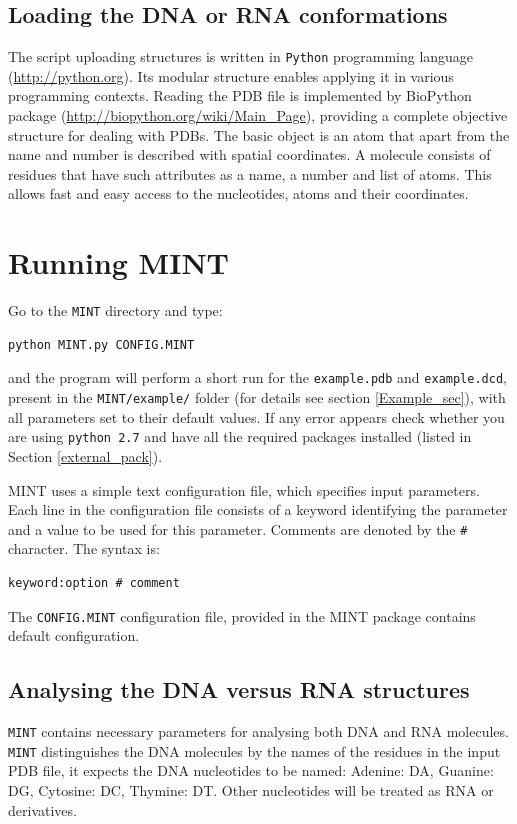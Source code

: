 \documentclass[12pt]{article}
\begin{document}
\subsection{Loading the DNA or RNA conformations}
The script uploading structures is written in {\tt Python} programming language (\url{http://python.org}). Its modular structure enables applying it in various programming contexts. Reading the PDB file is implemented by BioPython package (\url{http://biopython.org/wiki/Main_Page}), providing a complete objective structure for dealing with PDBs. The basic object is an atom that apart from the name and number is described with spatial coordinates. A molecule consists of residues that have such attributes as a name, a number and list of atoms. This allows fast and easy access to the nucleotides, atoms and their coordinates.

\section{Running MINT}
Go to the \texttt{MINT} directory and type:
\begin{verbatim}
python MINT.py CONFIG.MINT
\end{verbatim}
and the program will perform a short run for the \texttt{example.pdb} and \texttt{example.dcd}, present in the \texttt{MINT/example/} folder (for details see section \ref{Example_sec}), with all parameters set to their default values. If any error appears check whether you are using {\tt python 2.7} and have all the required packages installed (listed in Section \ref{external_pack}).

MINT uses a simple text configuration file, which specifies input parameters. Each line in the configuration file consists of a keyword identifying the parameter and a value to be used for this parameter. Comments are denoted by the \texttt{\#} character. The syntax is:
\begin{verbatim}
keyword:option # comment
\end{verbatim}

The \texttt{CONFIG.MINT} configuration file, provided in the MINT package contains default configuration. 

\subsection{Analysing the DNA versus RNA structures}
{\tt MINT} contains necessary parameters for analysing both DNA and RNA molecules. {\tt MINT} distinguishes the DNA molecules by the names of the residues in the input PDB file, it expects the DNA nucleotides to be named: Adenine: DA, Guanine: DG, Cytosine: DC, Thymine: DT. Other nucleotides will be treated as RNA or derivatives. 
\end{document}
